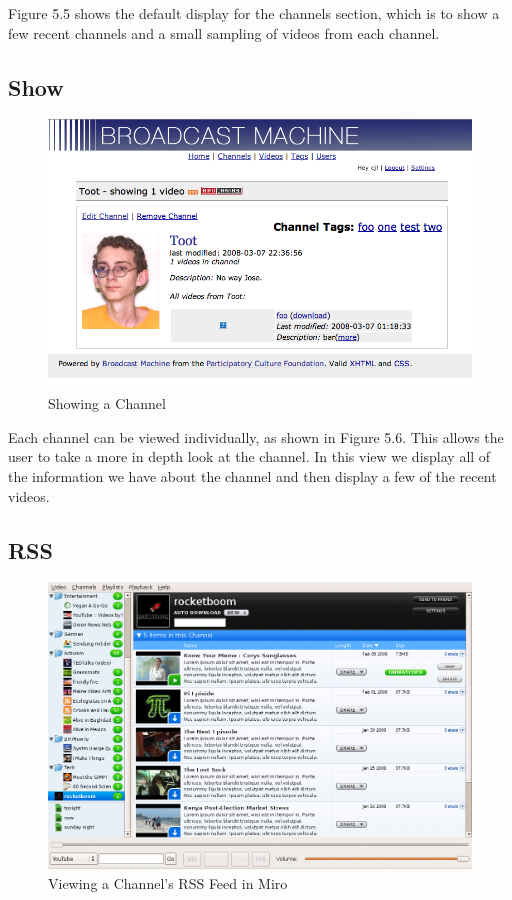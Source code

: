 \documentclass[a4paper,12pt]{report}
\begin{document}
Figure 5.5 shows the default display for the channels section, which is to show a few recent channels and a small sampling of videos from each channel.

\subsection{Show}
\begin{figure}[htp]
\begin{center}
\includegraphics[width=150mm]{./images/channelshow.png}
\end{center}
\caption{Showing a Channel}
\end{figure}

Each channel can be viewed individually, as shown in Figure 5.6.
This allows the user to take a more in depth look at the channel.
In this view we display all of the information we have about the channel and then display a few of the recent videos.

\subsection{RSS}
\begin{figure}[htp]
\begin{center}
\includegraphics[width=150mm]{./images/channelrss.png}
\end{center}
\caption{Viewing a Channel's RSS Feed in Miro}
\end{figure}
\end{document}

